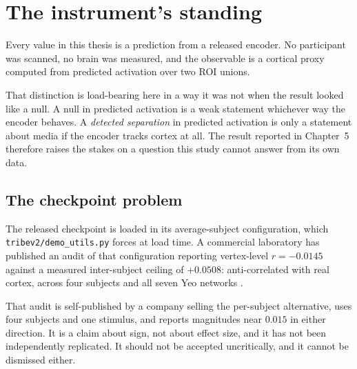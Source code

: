 \section{The instrument's standing}
\label{sec:standing}

Every value in this thesis is a prediction from a released encoder. No participant was
scanned, no brain was measured, and the observable is a cortical proxy computed from
predicted activation over two ROI unions.

That distinction is load-bearing here in a way it was not when the result looked like a null.
A null in predicted activation is a weak statement whichever way the encoder behaves. A
\emph{detected separation} in predicted activation is only a statement about media if the
encoder tracks cortex at all. The result reported in Chapter~5 therefore raises the stakes on
a question this study cannot answer from its own data.

\subsection{The checkpoint problem}

The released checkpoint is loaded in its average-subject configuration, which
\texttt{tribev2/demo\_utils.py} forces at load time. A commercial laboratory has published an
audit of that configuration reporting vertex-level $r = -0.0145$ against a measured
inter-subject ceiling of $+0.0508$: anti-correlated with real cortex, across four subjects
and all seven Yeo networks \cite{sapient2026, yeo2011}.

That audit is self-published by a company selling the per-subject alternative, uses four
subjects and one stimulus, and reports magnitudes near $0.015$ in either direction. It is a
claim about sign, not about effect size, and it has not been independently replicated. It
should not be accepted uncritically, and it cannot be dismissed either.

